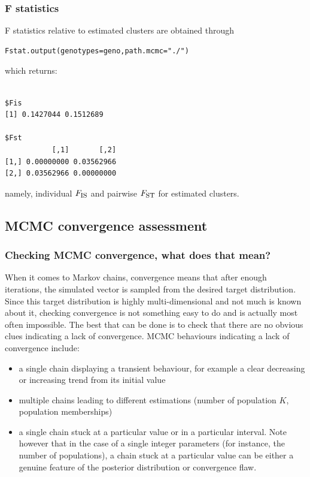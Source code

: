 \documentclass[a4paper,10pt]{article}
\newcommand{\Fst}{F_{\mbox{\footnotesize ST}}}
\newcommand{\Fis}{F_{\mbox{\footnotesize IS}}}
\begin{document}
\subsubsection{F statistics}
F statistics relative to estimated clusters are obtained through

\begin{verbatim}
Fstat.output(genotypes=geno,path.mcmc="./")
\end{verbatim}



which returns:

\begin{verbatim}

$Fis
[1] 0.1427044 0.1512689

$Fst
           [,1]       [,2]
[1,] 0.00000000 0.03562966
[2,] 0.03562966 0.00000000
\end{verbatim}



namely, individual  $\Fis$ and pairwise $\Fst$ for estimated clusters.



\subsection{MCMC convergence assessment}


\subsubsection{Checking MCMC convergence, what does that mean?}

When it comes to Markov chains, convergence means that after enough iterations, the simulated vector is sampled from the 
desired target distribution. 
Since this target distribution is highly multi-dimensional and not much is known about it, checking convergence is not something easy to do 
and is actually most often impossible. 
The best that can be done is to check that there are no obvious clues indicating a lack of convergence. 
MCMC behaviours indicating a lack of convergence include:

\begin{itemize}
\item a single chain displaying a transient behaviour, for example a clear decreasing or increasing trend from its initial value 
\item multiple chains leading to different estimations (number of population $K$, population memberships)
\item a single chain stuck at a particular value or in a particular interval. Note however that in the case of a single integer parameters 
(for instance, the number of populations), a chain stuck at a particular value can be either a genuine feature of the posterior distribution 
or convergence flaw.
\end{itemize} 
\end{document}

